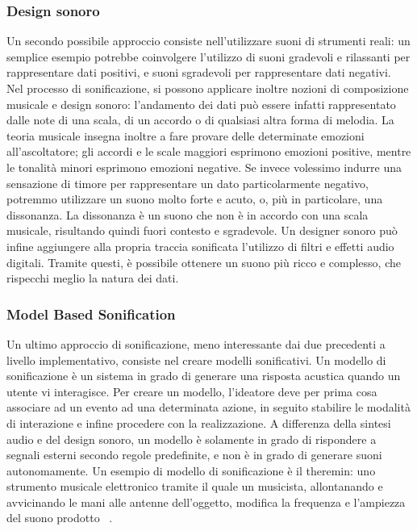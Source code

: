 \subsubsection{Design sonoro}
Un secondo possibile approccio consiste nell'utilizzare suoni di strumenti reali: un semplice esempio potrebbe coinvolgere l'utilizzo di suoni gradevoli e rilassanti per rappresentare dati positivi, e suoni sgradevoli per rappresentare dati negativi.
\\ Nel processo di sonificazione, si possono applicare inoltre nozioni di composizione musicale e design sonoro: l'andamento dei dati può essere infatti rappresentato dalle note di una scala, di un accordo o di qualsiasi altra forma di melodia.
La teoria musicale insegna inoltre a fare provare delle determinate emozioni all'ascoltatore; gli accordi e le scale maggiori esprimono emozioni positive, mentre le tonalità minori esprimono emozioni negative.
Se invece volessimo indurre una sensazione di timore per rappresentare un dato particolarmente negativo, potremmo utilizzare un suono molto forte e acuto, o, più in particolare, una dissonanza.
La dissonanza è un suono che non è in accordo con una scala musicale, risultando quindi fuori contesto e sgradevole.
Un designer sonoro può infine aggiungere alla propria traccia sonificata l'utilizzo di filtri e effetti audio digitali.
Tramite questi, è possibile ottenere un suono più ricco e complesso, che rispecchi meglio la natura dei dati.

\subsubsection{Model Based Sonification}
Un ultimo approccio di sonificazione, meno interessante dai due precedenti a livello implementativo, consiste nel creare modelli sonificativi.
Un modello di sonificazione è un sistema in grado di generare una risposta acustica quando un utente vi interagisce.
Per creare un modello, l'ideatore deve per prima cosa associare ad un evento ad una determinata azione, in seguito stabilire le modalità di interazione e infine procedere con la realizzazione.
A differenza della sintesi audio e del design sonoro, un modello è solamente in grado di rispondere a segnali esterni secondo regole predefinite, e non è in grado di generare suoni autonomamente.
Un esempio di modello di sonificazione è il theremin: uno strumento musicale elettronico tramite il quale un musicista, allontanando e avvicinando le mani alle antenne dell'oggetto, modifica la frequenza e l'ampiezza del suono prodotto ~\cite{sonification_model}.


